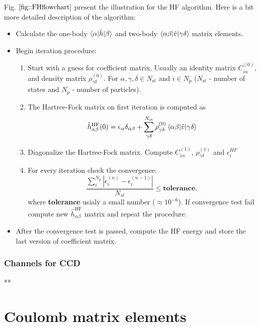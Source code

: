 \documentclass[twoside,english]{uiofysmaster}
\theoremstyle{definition}
\begin{document}
Fig. $\ref{fig::FHflowchart}$ present the illustration for the HF algorithm. Here is a bit more detailed description of the algorithm:
\begin{tcolorbox}
	\begin{itemize}
		\item Calculate the one-body $\braket{\alpha|\hat{h}|\beta}$ and two-body $\braket{\alpha\beta|\hat{v}|\gamma\delta}$ matrix elements.  \\
		\item Begin iteration procedure:
		\begin{enumerate}
			\item Start with a guess for coefficient matrix. Usually an identity matrix $C^{(0)}_{i\alpha}$,  and density matrix $\rho^{(0)}_{\gamma\delta}$. For $\alpha, \gamma, \delta \in N_{\text{st}}$ and $i \in N_{p}$ ($N_{\text{st}}$ - number of states and $N_{p}$ - number of particles). 
			\item The Hartree-Fock matrix on first iteration is computed as 
			 \[ \hat{h}^{\text{HF}}_{\alpha \beta}(0) = \epsilon_\alpha \delta_{\alpha\beta} + \sum_{\gamma\delta}^{N_{\text{st}}} \rho^{(0)}_{\gamma\delta} \braket{\alpha\beta|\hat{v}|\gamma\delta}  \] 
			 \item Diagonalize the Hartree-Fock matrix. Compute  $C^{(1)}_{i\alpha}$,   $\rho^{(1)}_{\gamma\delta}$ and $\epsilon_i^{HF}$
			 \item For every iteration check the convergence:
			 \[\frac{\sum_{i}^{N_p} |\epsilon_i^{(n)}- \epsilon_i^{(n-1)}|}{N_{st}} \leq \textbf{tolerance},\]
			 where \textbf{tolerance} usialy a small number ($\approx 10^{-6}$). If convergence test fail compute new $\hat{h}^{\text{HF}}_{\alpha \beta}$ matrix and repeat the procedure.			 	
		\end{enumerate} 
		\item After the convergence test is passed, compute the HF energy and store the last version of coefficient matrix. 
	\end{itemize}
\end{tcolorbox}


\subsection{Channels for CCD}

\clearpage
**\appendix
\chapter{Coulomb matrix elements}\label{app:1}




\printbibliography 
\end{document}

